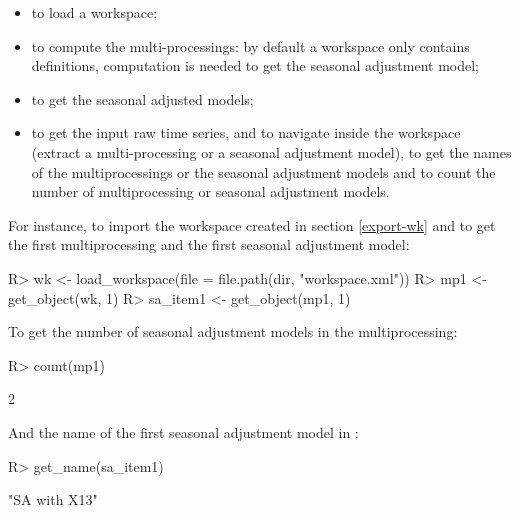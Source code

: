 \documentclass[article]{jss}
\providecommand{\tightlist}{%
  \setlength{\itemsep}{0pt}\setlength{\parskip}{0pt}}
\begin{document}
\begin{itemize}
\tightlist
\item
   to load a workspace;\\
\item
   to compute the multi-processings: by default a
  workspace only contains definitions, computation is needed to get the
  seasonal adjustment model;\\
\item
   to get the seasonal adjusted models;\\
\item
   to get the input raw time series, 
  and  to navigate inside the workspace (extract a
  multi-processing or a seasonal adjustment model),  to
  get the names of the multiprocessings or the seasonal adjustment
  models and  to count the number of multiprocessing or
  seasonal adjustment models.
\end{itemize}

For instance, to import the workspace created in section \ref{export-wk}
and to get the first multiprocessing and the first seasonal adjustment
model:

\begin{CodeChunk}

\begin{CodeInput}
R> wk <- load_workspace(file =  file.path(dir, "workspace.xml"))
R> mp1 <- get_object(wk, 1)
R> sa_item1 <- get_object(mp1, 1)
\end{CodeInput}
\end{CodeChunk}

To get the number of seasonal adjustment models in the multiprocessing:

\begin{CodeChunk}

\begin{CodeInput}
R> count(mp1)
\end{CodeInput}

\begin{CodeOutput}
[1] 2
\end{CodeOutput}
\end{CodeChunk}

And the name of the first seasonal adjustment model in
:

\begin{CodeChunk}

\begin{CodeInput}
R> get_name(sa_item1) 
\end{CodeInput}

\begin{CodeOutput}
[1] "SA with X13"
\end{CodeOutput}
\end{CodeChunk}
\end{document}
